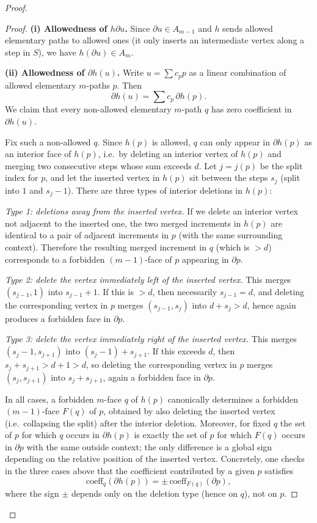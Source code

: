 \documentclass[11pt]{amsart}
\theoremstyle{plain}
\theoremstyle{definition}
\numberwithin{equation}{section}
\begin{document}
\begin{proof}
\begin{proof}
\medskip\noindent
\textbf{(i) Allowedness of $h\partial u$.}
Since $\partial u\in A_{m-1}$ and $h$ sends allowed elementary paths to allowed ones (it only inserts an intermediate
vertex along a step in $S$), we have $h(\partial u)\in A_m$.

\medskip\noindent
\textbf{(ii) Allowedness of $\partial h(u)$.}
Write $u=\sum c_p p$ as a linear combination of allowed elementary $m$-paths $p$.  Then
\[
\partial h(u)=\sum c_p\,\partial h(p).
\]
We claim that every non-allowed elementary $m$-path $q$ has zero coefficient in $\partial h(u)$.

Fix such a non-allowed $q$.  Since $h(p)$ is allowed, $q$ can only appear in $\partial h(p)$ as an interior face of $h(p)$, i.e.\ by deleting an interior vertex of $h(p)$ and merging two consecutive steps whose sum exceeds $d$.
Let $j=j(p)$ be the split index for $p$, and let the inserted vertex in $h(p)$ sit between the steps
$s_{j}$ (split into $1$ and $s_j-1$).
There are three types of interior deletions in $h(p)$:

\smallskip
\emph{Type 1: deletions away from the inserted vertex.}
If we delete an interior vertex not adjacent to the inserted one, the two merged increments in $h(p)$
are identical to a pair of adjacent increments in $p$ (with the same surrounding context).
Therefore the resulting merged increment in $q$ (which is $>d$) corresponds to a forbidden $(m-1)$-face of $p$
appearing in $\partial p$.

\smallskip
\emph{Type 2: delete the vertex immediately left of the inserted vertex.}
This merges $(s_{j-1},1)$ into $s_{j-1}+1$.  If this is $>d$, then necessarily $s_{j-1}=d$, and deleting the
corresponding vertex in $p$ merges $(s_{j-1},s_j)$ into $d+s_j>d$, hence again produces a forbidden face in $\partial p$.

\smallskip
\emph{Type 3: delete the vertex immediately right of the inserted vertex.}
This merges $(s_j-1,s_{j+1})$ into $(s_j-1)+s_{j+1}$.  If this exceeds $d$, then $s_j+s_{j+1}>d+1>d$, so deleting
the corresponding vertex in $p$ merges $(s_j,s_{j+1})$ into $s_j+s_{j+1}$, again a forbidden face in $\partial p$.

\medskip
In all cases, a forbidden $m$-face $q$ of $h(p)$ canonically determines a forbidden $(m-1)$-face $F(q)$ of $p$,
obtained by also deleting the inserted vertex (i.e.\ collapsing the split) after the interior deletion.
Moreover, for fixed $q$ the set of $p$ for which $q$ occurs in $\partial h(p)$ is exactly the set of $p$ for which
$F(q)$ occurs in $\partial p$ with the same outside context; the only difference is a global sign depending on the
relative position of the inserted vertex.  Concretely, one checks in the three cases above that the coefficient
contributed by a given $p$ satisfies
\[
\mathrm{coeff}_q(\partial h(p))=\pm\,\mathrm{coeff}_{F(q)}(\partial p),
\]
where the sign $\pm$ depends only on the deletion type (hence on $q$), not on $p$.


\end{proof}
\end{proof}
\end{document}
